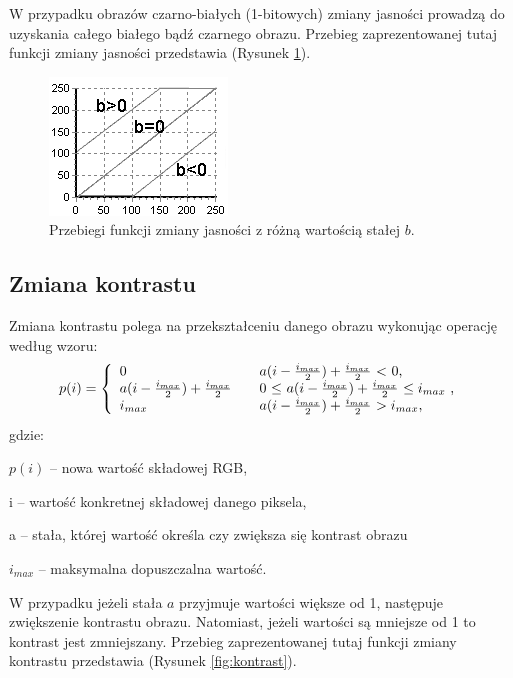 \documentclass{classrep}
\begin{document}
W przypadku obrazów czarno-białych (1-bitowych) zmiany jasności prowadzą do uzyskania całego białego bądź czarnego obrazu.
Przebieg zaprezentowanej tutaj funkcji zmiany jasności przedstawia (Rysunek \ref{fig:jasnosc}).

\begin{figure}[h!]
\centering
\includegraphics{obrazy/jasnosc.png} 
\caption[Zmiana jasności]{Przebiegi funkcji zmiany jasności z różną wartością stałej $b$.}
\label{fig:jasnosc}
\end{figure}

\subsection{Zmiana kontrastu}
Zmiana kontrastu polega na przekształceniu danego obrazu wykonując operację według wzoru:
\begin{equation}
\label{kontrastWzor}
p(i)=\left\{
\begin{array}{l l l}
0 & \quad \mbox{$a (i-\frac{i_{max}}{2}) + \frac{i_{max}}{2}$ $<$ 0,} \\
a (i-\frac{i_{max}}{2}) + \frac{i_{max}}{2} & \quad \mbox{0 $\leq$ $a (i-\frac{i_{max}}{2}) + \frac{i_{max}}{2}$ $\leq i_{max}$ ,} \\
i_{max} & \quad \mbox{$a (i-\frac{i_{max}}{2}) + \frac{i_{max}}{2}$ $ > i_{max}$,} \\
\end{array}
\right.
\end{equation}
gdzie:
\begin{description}
\item $p(i)$ -- nowa wartość składowej RGB,
\item i -- wartość konkretnej składowej danego piksela,
\item a -- stała, której wartość określa czy zwiększa się kontrast obrazu
\item $i_{max}$ -- maksymalna dopuszczalna wartość.
\end{description}

W przypadku jeżeli stała $a$ przyjmuje wartości większe od 1, następuje zwiększenie kontrastu obrazu. Natomiast, jeżeli wartości są mniejsze od 1 to kontrast jest zmniejszany. Przebieg zaprezentowanej tutaj funkcji zmiany kontrastu przedstawia (Rysunek \ref{fig:kontrast}).
\end{document}

